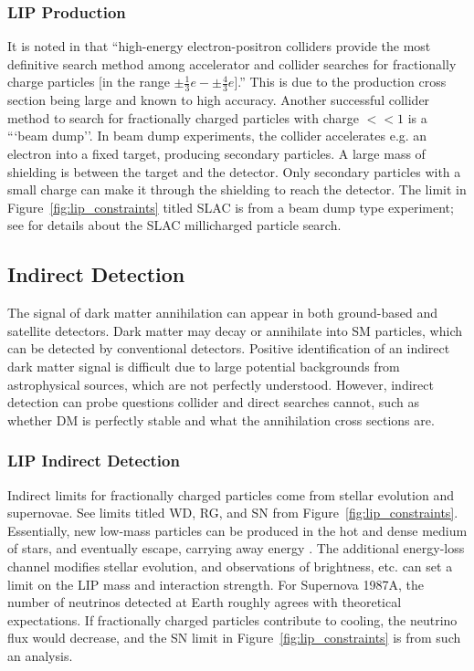 \subsubsection{LIP Production}
It is noted in \cite{Perl2009} that ``high-energy electron-positron colliders provide the most definitive search method among accelerator and collider searches for fractionally charge particles [in the range $\pm\frac{1}{3}e -\pm \frac{4}{3}e$].'' This is due to the production cross section being large and known to high accuracy. Another successful collider method to search for fractionally charged particles with charge $<<1$ is a ```beam dump''. In beam dump experiments, the collider accelerates e.g. an electron into a fixed target, producing secondary particles. A large mass of shielding is between the target and the detector. Only secondary particles with a small charge can make it through the shielding to reach the detector. The limit in Figure~\ref{fig:lip_constraints} titled SLAC is from a beam dump type experiment; see \cite{Prinz1998} for details about the SLAC millicharged particle search.

\subsection{Indirect Detection}
The signal of dark matter annihilation can appear in both ground-based and satellite detectors. Dark matter may decay or annihilate into \ac{SM} particles, which can be detected by conventional detectors. Positive identification of an indirect dark matter signal is difficult due to large potential backgrounds from astrophysical sources, which are not perfectly understood. However, indirect detection can probe questions collider and direct searches cannot, such as whether \ac{DM} is perfectly stable and what the annihilation cross sections are. 

\subsubsection{LIP Indirect Detection}
Indirect limits for fractionally charged particles come from stellar evolution and supernovae. See limits titled WD, RG, and SN from Figure~\ref{fig:lip_constraints}. Essentially, new low-mass particles can be produced in the hot and dense medium of stars, and eventually escape, carrying away energy \cite{Davidson2000}. The additional energy-loss channel modifies stellar evolution, and observations of brightness, etc. can set a limit on the \ac{LIP} mass and interaction strength. For Supernova 1987A, the number of neutrinos detected at Earth roughly agrees with theoretical expectations. If fractionally charged particles contribute to cooling, the neutrino flux would decrease, and the SN limit in Figure~\ref{fig:lip_constraints} is from such an analysis.

